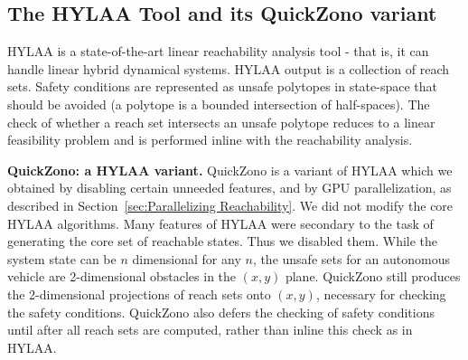 \documentclass[runningheads]{llncs}
\begin{document}
\subsection{The HYLAA Tool and its QuickZono variant}
HYLAA \cite{hylaa} is a state-of-the-art linear reachability analysis tool - that is, it can handle linear hybrid dynamical systems.
HYLAA output is a collection of reach sets. %
Safety conditions are represented as unsafe polytopes in state-space that should be avoided (a polytope is a bounded intersection of half-spaces). 
The check of whether a reach set intersects an unsafe polytope reduces to a linear feasibility problem and is performed inline with the reachability analysis. 

\textbf{QuickZono: a HYLAA variant.}
QuickZono is a variant of HYLAA which we obtained by disabling certain unneeded features, and by GPU parallelization, as described in Section~\ref{sec:Parallelizing Reachability}. 
We did not modify the core HYLAA algorithms.
Many features of HYLAA were secondary to the task of generating the core set of reachable states.
Thus we disabled them.
While the system state can be $n$ dimensional for any $n$, the unsafe sets for an autonomous vehicle are 2-dimensional obstacles in the $(x,y)$ plane. 
QuickZono still produces the  2-dimensional projections of reach sets onto $(x,y)$, necessary for checking the safety conditions.
QuickZono also defers the checking of safety conditions until after all reach sets are computed, rather than inline this check as in HYLAA.
\end{document}
